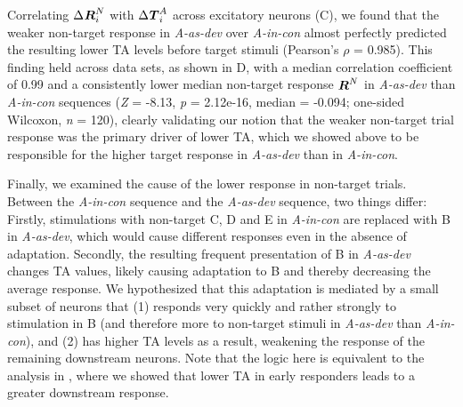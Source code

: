 \documentclass[9pt,lineno,onehalfspacing]{elife}
\newcommand{\dev}{\textit{A-as-dev}}
\newcommand{\msc}{\textit{A-in-con}}
\newcommand{\std}{\textit{A-as-std}}
\newcommand{\ifstringequal}[4]{%
  \ifnum\pdfstrcmp{#1}{#2}=0
  #3%
  \else
  #4%
  \fi
}
\newcommand{\seqreplace}[1]{\ifstringequal{dev}{#1}{\dev}{%
    \ifstringequal{std}{#1}{\std}{%
        \ifstringequal{msc}{#1}{\msc}{#1}%
    }%
}}
\newcommand{\R}[3][]{{}^{\seqreplace{#1}}_{}\boldsymbol R^{#2}_{#3}}
\newcommand{\T}[3][]{{}^{\seqreplace{#1}}_{}\boldsymbol T^{#2}_{#3}}
\begin{document}
Correlating $\Delta \R{N}{i}$ with $\Delta \T{A}{i}$ across excitatory neurons (C), we found that the weaker non-target response in \dev{} over \msc{} almost perfectly predicted the resulting lower TA levels before target stimuli (Pearson's $\rho$ = 0.985).
This finding held across data sets, as shown in D, with a median correlation coefficient of 0.99 and a consistently lower median non-target response $\R{N}{}$ in \dev{} than \msc{} sequences (\textit{Z} = -8.13, \textit{p} = 2.12e-16, median = -0.094; one-sided Wilcoxon, \textit{n} = 120), clearly validating our notion that the weaker non-target trial response was the primary driver of lower TA, which we showed above to be responsible for the higher target response in \dev{} than in \msc{}.

Finally, we examined the cause of the lower response in non-target trials. Between the \msc{} sequence and the \dev{} sequence, two things differ: Firstly, stimulations with non-target C, D and E in \msc{} are replaced with B in \dev{}, which would cause different responses even in the absence of adaptation. Secondly, the resulting  frequent presentation of B in \dev{} changes TA values, likely causing adaptation to B and thereby decreasing the average response. We hypothesized that this adaptation is mediated by a small subset of neurons that (1) responds very quickly and rather strongly to stimulation in B (and therefore more to non-target stimuli in \dev{} than \msc{}), and (2) has higher TA levels as a result, weakening the response of the remaining downstream neurons. Note that the logic here is equivalent to the analysis in , where we showed that lower TA in early responders leads to a greater downstream response.
\end{document}
